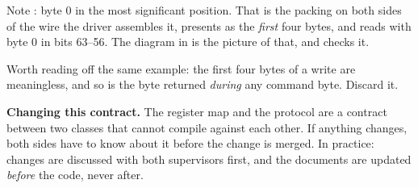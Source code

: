 Note : byte 0 in the most significant position. That is the packing on both sides
of the wire \textemdash{} the driver assembles it,  presents  as
the \emph{first} four bytes, and  reads  with byte 0 in bits
63--56. The diagram in  is the picture of that, and
 checks it.

Worth reading off the same example: the first four  bytes of a write are meaningless, and
so is the  byte returned \emph{during} any command byte. Discard it.

\begin{aside}
\textbf{Changing this contract.} The register map and the protocol are a contract between two classes
that cannot compile against each other. If anything changes, both sides have to know about it before
the change is merged. In practice: changes are discussed with both supervisors first, and the
documents are updated \emph{before} the code, never after.
\end{aside}
